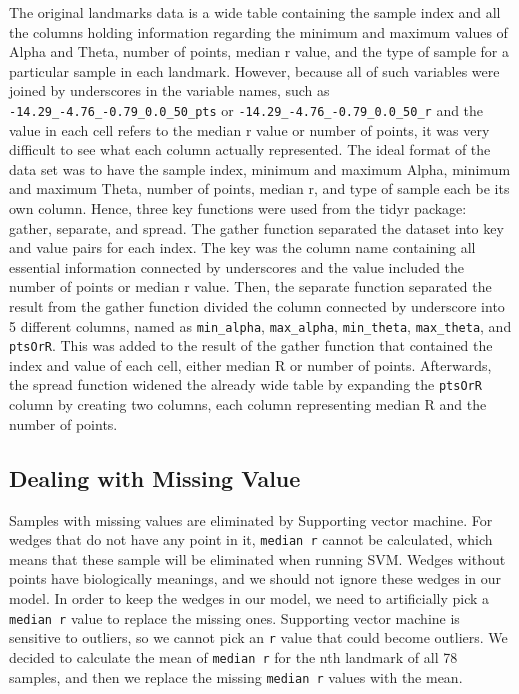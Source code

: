 \documentclass[10pt,letterpaper]{article}
\begin{document}
The original landmarks data is a wide table containing the sample index
and all the columns holding information regarding the minimum and
maximum values of Alpha and Theta, number of points, median r value, and
the type of sample for a particular sample in each landmark. However,
because all of such variables were joined by underscores in the variable
names, such as \texttt{-14.29\_-4.76\_-0.79\_0.0\_50\_pts} or
\texttt{-14.29\_-4.76\_-0.79\_0.0\_50\_r} and the value in each cell
refers to the median r value or number of points, it was very difficult
to see what each column actually represented. The ideal format of the
data set was to have the sample index, minimum and maximum Alpha,
minimum and maximum Theta, number of points, median r, and type of
sample each be its own column. Hence, three key functions were used from
the tidyr package: gather, separate, and spread. The gather function
separated the dataset into key and value pairs for each index. The key
was the column name containing all essential information connected by
underscores and the value included the number of points or median r
value. Then, the separate function separated the result from the gather
function divided the column connected by underscore into 5 different
columns, named as \texttt{min\_alpha}, \texttt{max\_alpha},
\texttt{min\_theta}, \texttt{max\_theta}, and \texttt{ptsOrR}. This was
added to the result of the gather function that contained the index and
value of each cell, either median R or number of points. Afterwards, the
spread function widened the already wide table by expanding the
\texttt{ptsOrR} column by creating two columns, each column representing
median R and the number of points.

\subsection{Dealing with Missing
Value}\label{dealing-with-missing-value}

Samples with missing values are eliminated by Supporting vector machine.
For wedges that do not have any point in it, \texttt{median\ r} cannot
be calculated, which means that these sample will be eliminated when
running SVM. Wedges without points have biologically meanings, and we
should not ignore these wedges in our model. In order to keep the wedges
in our model, we need to artificially pick a \texttt{median\ r} value to
replace the missing ones. Supporting vector machine is sensitive to
outliers, so we cannot pick an \texttt{r} value that could become
outliers. We decided to calculate the mean of \texttt{median\ r} for the
nth landmark of all 78 samples, and then we replace the missing
\texttt{median\ r} values with the mean.
\end{document}
